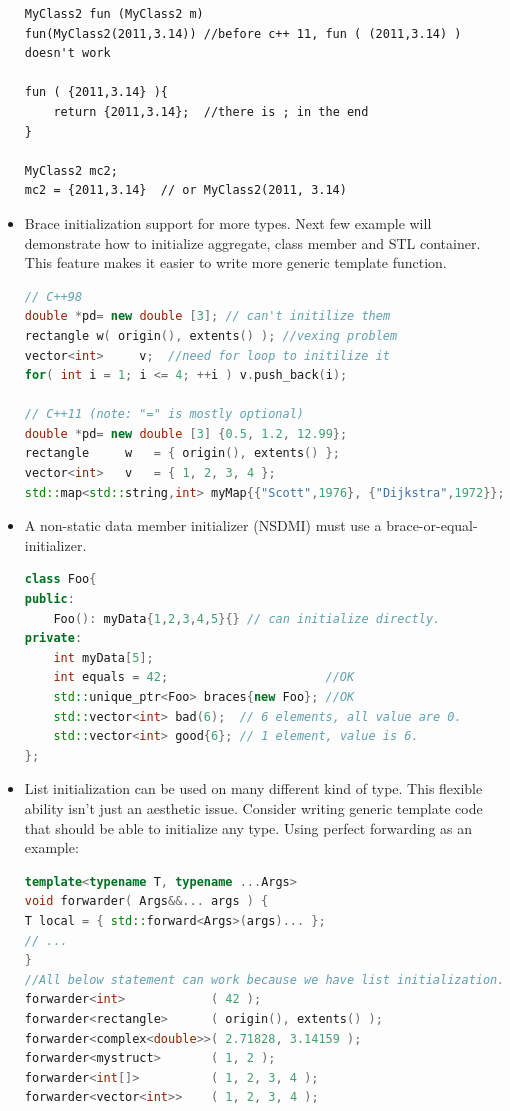 \documentclass[a4paper,11pt,twoside]{book}
\begin{document}
\begin{itemize}
\begin{lstlisting}
MyClass2 fun (MyClass2 m) 
fun(MyClass2(2011,3.14)) //before c++ 11, fun ( (2011,3.14) ) doesn't work

fun ( {2011,3.14} ){
	return {2011,3.14};  //there is ; in the end
}

MyClass2 mc2;
mc2 = {2011,3.14}  // or MyClass2(2011, 3.14)
\end{lstlisting}

    \item Brace initialization support for more types. Next few example will demonstrate how to initialize aggregate, class member and STL container. This feature makes it easier to write more generic template function. 

\begin{lstlisting}[frame=single, language=c++,mathescape=true]
// C++98 
double *pd= new double [3]; // can't initilize them
rectangle w( origin(), extents() ); //vexing problem
vector<int>     v;  //need for loop to initilize it
for( int i = 1; i <= 4; ++i ) v.push_back(i);

// C++11 (note: "=" is mostly optional)
double *pd= new double [3] {0.5, 1.2, 12.99};
rectangle     w   = { origin(), extents() }; 
vector<int>   v   = { 1, 2, 3, 4 };
std::map<std::string,int> myMap{{"Scott",1976}, {"Dijkstra",1972}};
\end{lstlisting}

\item A non-static data member initializer (NSDMI) must use a brace-or-equal-initializer.
\begin{lstlisting}[frame=single, language=c++, mathescape=true]
class Foo{
public:
	Foo(): myData{1,2,3,4,5}{} // can initialize directly.
private:
	int myData[5];
	int equals = 42;                      //OK
	std::unique_ptr<Foo> braces{new Foo}; //OK
	std::vector<int> bad(6);  // 6 elements, all value are 0.
	std::vector<int> good{6}; // 1 element, value is 6. 
};
  	\end{lstlisting}
	
\item List initialization can be used on many different kind of type. This flexible ability isn't just an aesthetic issue. Consider writing generic template code that should be able to initialize any type. Using perfect forwarding as an example:

\begin{lstlisting}[frame=single, language=c++,mathescape=true]
template<typename T, typename ...Args>
void forwarder( Args&&... args ) {
T local = { std::forward<Args>(args)... };
// ...
}
//All below statement can work because we have list initialization.
forwarder<int>            ( 42 );                  
forwarder<rectangle>      ( origin(), extents() ); 
forwarder<complex<double>>( 2.71828, 3.14159 );    
forwarder<mystruct>       ( 1, 2 );                
forwarder<int[]>          ( 1, 2, 3, 4 );          
forwarder<vector<int>>    ( 1, 2, 3, 4 );          
\end{lstlisting}


\end{itemize}
\end{document}
